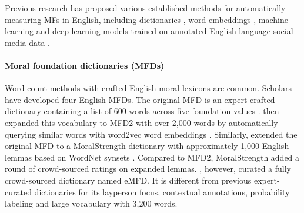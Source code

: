 

Previous research has proposed various established methods for automatically measuring MFs in English, including dictionaries \citep{graham2009liberals, frimer2019moral, hopp2021extended}, word embeddings \citep{kwak2021frameaxis, araque2020moralstrength}, machine learning and deep learning models \citep{preniqi2024moralbert, nguyen2024measuring} trained on annotated English-language social media data \citep{hoover2020moral, trager2022moral}. %

\paragraph{Moral foundation dictionaries (MFDs)} 
Word-count methods with crafted English moral lexicons are common. Scholars have developed four English MFDs. The original MFD is an expert-crafted dictionary containing a list of 600 words across five foundation values \citep{graham2009liberals}. \citet{frimer2019moral} then expanded this vocabulary to MFD2 with over 2,000 words by automatically querying similar words with word2vec word embeddings \citep{mikolov2013distributed}. Similarly, \citet{araque2020moralstrength} extended the original MFD to a MoralStrength dictionary with approximately 1,000 English lemmas based on WordNet synsets \citep{wordnet2010princeton}. Compared to MFD2, MoralStrength added a round of crowd-sourced ratings on expanded lemmas. \citet{hopp2021extended}, however, curated a fully crowd-sourced dictionary named eMFD. It is different from previous expert-curated dictionaries for its layperson focus, contextual annotations, probability labeling and large vocabulary with 3,200 words. 


